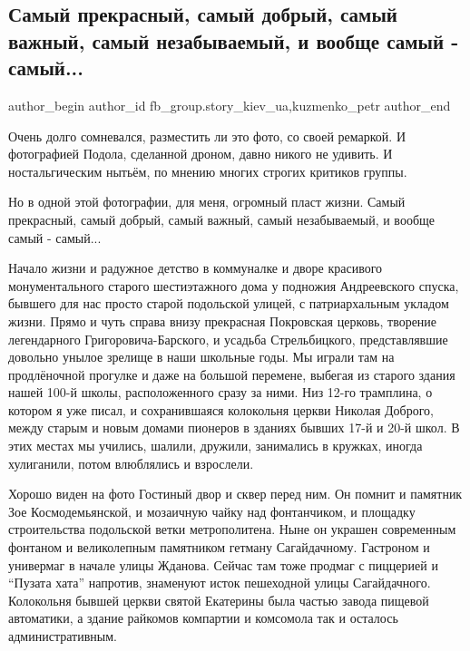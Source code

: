  
 
 
 
 
 
\subsection{Самый прекрасный, самый добрый, самый важный, самый незабываемый, и вообще самый - самый...}
\label{sec:10_12_2021.fb.fb_group.story_kiev_ua.2.samyj_samyj_podol}
 
\ifcmt
 author_begin
   author_id fb_group.story_kiev_ua,kuzmenko_petr
 author_end
\fi

Очень долго сомневался, разместить ли это фото, со своей ремаркой. И
фотографией Подола, сделанной дроном, давно никого не удивить. И
ностальгическим нытьём, по мнению многих строгих критиков группы. 

Но в одной этой фотографии, для меня, огромный пласт жизни. Самый прекрасный,
самый добрый, самый важный, самый незабываемый, и вообще самый - самый... 

Начало жизни и радужное детство в коммуналке и дворе красивого монументального
старого шестиэтажного дома у подножия Андреевского спуска, бывшего для нас
просто старой подольской улицей, с патриархальным укладом жизни. Прямо и чуть
справа внизу прекрасная Покровская церковь, творение легендарного
Григоровича-Барского, и усадьба Стрельбицкого, представлявшие довольно унылое
зрелище в наши школьные годы. Мы играли там на продлёночной прогулке и даже на
большой перемене, выбегая из старого здания нашей 100-й школы, расположенного
сразу за ними. Низ 12-го трамплина, о котором я уже писал, и сохранившаяся
колокольня церкви Николая Доброго, между старым и новым домами пионеров в
зданиях бывших 17-й и 20-й школ. В этих местах мы учились, шалили, дружили,
занимались в кружках, иногда хулиганили, потом влюблялись и взрослели. 

Хорошо виден на фото Гостиный двор и сквер перед ним. Он помнит и памятник Зое
Космодемьянской, и мозаичную чайку над фонтанчиком, и площадку строительства
подольской ветки метрополитена. Ныне он украшен современным фонтаном и
великолепным памятником гетману Сагайдачному. Гастроном и универмаг в начале
улицы Жданова. Сейчас там тоже продмаг с пиццерией и \enquote{Пузата хата}
напротив, знаменуют исток пешеходной улицы Сагайдачного. Колокольня бывшей
церкви святой Екатерины была частью завода пищевой автоматики, а здание
райкомов компартии и комсомола так и осталось административным. 

